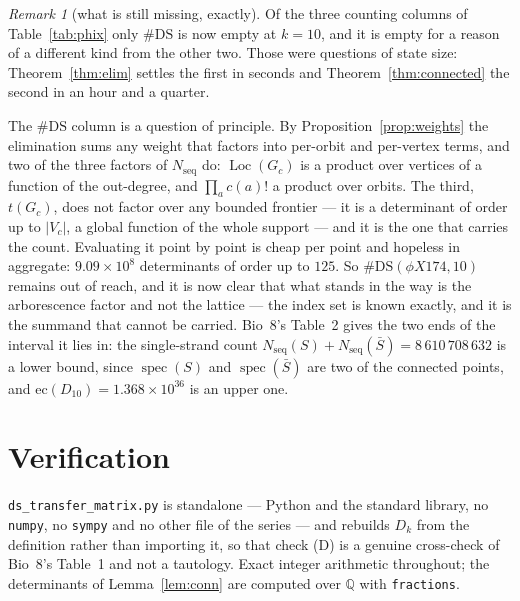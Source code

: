 \documentclass[11pt]{article}
\theoremstyle{plain}
\theoremstyle{definition}
\theoremstyle{remark}
\newtheorem{remark}[theorem]{Remark}
\newcommand{\spec}{\operatorname{spec}}
\newcommand{\Loc}{\operatorname{Loc}}
\newcommand{\Nseq}{N_{\mathrm{seq}}}
\newcommand{\DS}{\mathrm{DS}}
\begin{document}
\begin{remark}[what is still missing, exactly]\label{rem:wall}
Of the three counting columns of Table~\ref{tab:phix} only $\#\DS$ is now empty at $k=10$, and
it is empty for a reason of a different kind from the other two. Those were questions of state
size: Theorem~\ref{thm:elim} settles the first in seconds and Theorem~\ref{thm:connected} the
second in an hour and a quarter.

The $\#\DS$ column is a question of principle. By
Proposition~\ref{prop:weights} the elimination sums any weight that factors into per-orbit and
per-vertex terms, and two of the three factors of $\Nseq$ do: $\Loc(G_c)$ is a product over
vertices of a function of the out-degree, and $\prod_a c(a)!$ a product over orbits. The third,
$t(G_c)$, does not factor over any bounded frontier --- it is a determinant of order up to
$|V_c|$, a global function of the whole support --- and it is the one that carries the count.
Evaluating it point by point is cheap per point and hopeless in aggregate: $9.09\times10^8$
determinants of order up to $125$. So $\#\DS(\phi X174,10)$ remains out of reach, and it is
now clear that what stands in the way is the arborescence factor and not the lattice --- the
index set is known exactly, and it is the summand that cannot be carried. Bio~8's Table~2
gives the two ends of the interval it lies in: the single-strand count
$\Nseq(S)+\Nseq(\bar S)=8\,610\,708\,632$ is a lower bound, since $\spec(S)$ and $\spec(\bar S)$
are two of the connected points, and $\mathrm{ec}(D_{10})=1.368\times10^{36}$ is an upper one.
\end{remark}

\section{Verification}\label{sec:checks}

\texttt{ds\_transfer\_matrix.py} is standalone --- Python and the standard library, no
\texttt{numpy}, no \texttt{sympy} and no other file of the series --- and rebuilds $D_k$ from
the definition rather than importing it, so that check (D) is a genuine cross-check of Bio~8's
Table~1 and not a tautology. Exact integer arithmetic throughout; the determinants of
Lemma~\ref{lem:conn} are computed over $\mathbb Q$ with \texttt{fractions}.
\end{document}
